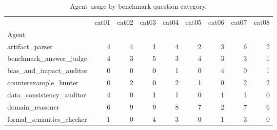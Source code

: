 \begin{table}
\caption{Agent usage by benchmark question category.}
\label{tab:agent-usage-by-category}
\begin{tabular}{lrrrrrrrr}
\toprule
 & cat01 & cat02 & cat03 & cat04 & cat05 & cat06 & cat07 & cat08 \\
Agent &  &  &  &  &  &  &  &  \\
\midrule
artifact\_parser & 4 & 4 & 1 & 4 & 2 & 3 & 6 & 2 \\
benchmark\_answer\_judge & 4 & 3 & 5 & 3 & 4 & 3 & 3 & 1 \\
bias\_and\_impact\_auditor & 0 & 0 & 0 & 1 & 0 & 4 & 0 & 1 \\
counterexample\_hunter & 0 & 2 & 0 & 2 & 1 & 0 & 2 & 2 \\
data\_consistency\_auditor & 4 & 0 & 1 & 1 & 0 & 1 & 1 & 0 \\
domain\_reasoner & 6 & 9 & 9 & 8 & 7 & 2 & 7 & 6 \\
formal\_semantics\_checker & 1 & 0 & 4 & 3 & 0 & 1 & 3 & 0 \\
\bottomrule
\end{tabular}
\end{table}
